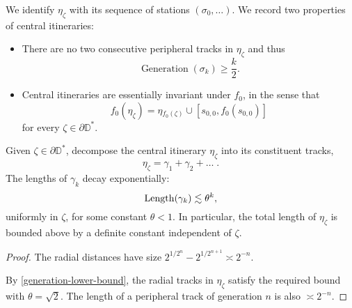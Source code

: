 

We identify $\eta_{\zeta}$ with its sequence of stations $(\sigma_0,\ldots)$. We record two properties of central itineraries:

\begin{itemize}
	\item There are no two consecutive peripheral tracks in $\eta_{\zeta}$ and thus
	\begin{equation} \label{generation-lower-bound}
		\operatorname{Generation}(\sigma_k)\geq \frac k2.
	\end{equation}
	
	\item Central itineraries are essentially invariant under $f_{0}$, in the sense that
	\begin{equation*}
		f_{0}(\eta_{\zeta})=\eta{}_{f_{0}(\zeta)}\cup[s_{0,0},f_0(s_{0,0})]
	\end{equation*}
	for every $\zeta\in \partial \mathbb D^*$.
\end{itemize}

\begin{lemma} \label{track_decay}
Given $\zeta\in \partial \mathbb D^*$, decompose the central itinerary $\eta_{\zeta}$ into its constituent tracks, 
$$\eta_{\zeta}=\gamma _1 + \gamma_2 + \dots \; .$$ 
	The lengths of $\gamma_k$ decay exponentially:
	$$\operatorname{Length}(\gamma_{k})\lesssim \theta^{k},$$ uniformly in $\zeta$, for some constant $\theta<1$.
In particular, the total length of $\eta_\zeta$ is bounded above by a definite constant independent of $\zeta$.
\end{lemma}
\begin{proof}
	The radial distances have size $2^{1/2^n}-2^{1/2^{n+1}} \asymp 2^{-n}.$
	\begin{comment}
		$$2^{1/2^n}-2^{1/2^{n+1}} = 2^{1/2^{n+1}} \sum_{k=1}^{\infty} \binom{1/2^{n+1}}{k} \asymp 2^{-n}.$$
	\end{comment}
	By \eqref{generation-lower-bound}, the radial tracks in $\eta_\zeta$ satisfy the required bound with $\theta = \sqrt 2$. The length of a peripheral track of generation $n$ is also $\asymp 2^{-n}$.
\end{proof}




